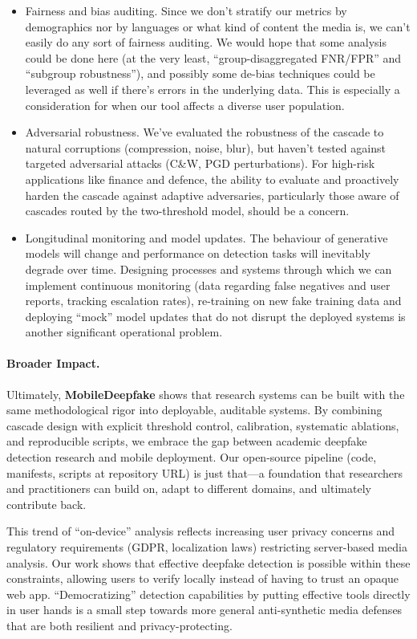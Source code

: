 \begin{itemize}[leftmargin=*,itemsep=2pt,parsep=0pt]
  \item Fairness and bias auditing. Since we don't stratify our metrics by demographics nor by languages or what kind of content the media is, we can't easily do any sort of fairness auditing. We would hope that some analysis could be done here (at the very least, ``group\hyp disaggregated FNR/FPR'' and ``subgroup robustness''), and possibly some de\hyp bias techniques could be leveraged as well if there's errors in the underlying data. This is especially a consideration for when our tool affects a diverse user population.

  \item Adversarial robustness. We've evaluated the robustness of the cascade to natural corruptions (compression, noise, blur), but haven't tested against targeted adversarial attacks (C\&W, PGD perturbations). For high\hyp risk applications like finance and defence, the ability to evaluate and proactively harden the cascade against adaptive adversaries, particularly those aware of cascades routed by the two\hyp threshold model, should be a concern.

  \item Longitudinal monitoring and model updates. The behaviour of generative models will change and performance on detection tasks will inevitably degrade over time. Designing processes and systems through which we can implement continuous monitoring (data regarding false negatives and user reports, tracking escalation rates), re\hyp training on new fake training data and deploying ``mock'' model updates that do not disrupt the deployed systems is another significant operational problem.
\end{itemize}

\paragraph{Broader Impact.}
Ultimately, \textbf{MobileDeepfake} shows that research systems can be built with the same methodological rigor into deployable, auditable systems. By combining cascade design with explicit threshold control, calibration, systematic ablations, and reproducible scripts, we embrace the gap between academic deepfake detection research and mobile deployment. Our open\hyp source pipeline (code, manifests, scripts at repository URL) is just that---a foundation that researchers and practitioners can build on, adapt to different domains, and ultimately contribute back.

This trend of ``on\hyp device'' analysis reflects increasing user privacy concerns and regulatory requirements (GDPR, localization laws) restricting server\hyp based media analysis. Our work shows that effective deepfake detection is possible within these constraints, allowing users to verify locally instead of having to trust an opaque web app. ``Democratizing'' detection capabilities by putting effective tools directly in user hands is a small step towards more general anti\hyp synthetic media defenses that are both resilient and privacy\hyp protecting.

